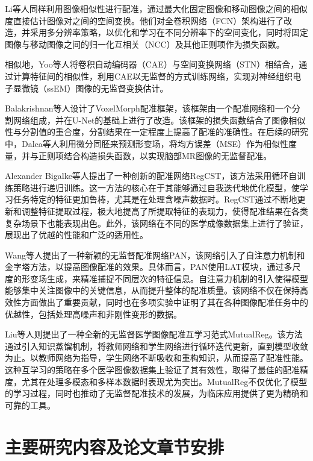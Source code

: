 Li等人同样利用图像相似性进行配准，通过最大化固定图像和移动图像之间的相似度直接估计图像对之间的空间变换。他们对全卷积网络（FCN）\cite{long2015fully}架构进行了改造，并采用多分辨率策略，以优化和学习在不同分辨率下的空间变化，同时将固定图像与移动图像之间的归一化互相关（NCC）及其他正则项作为损失函数。

相似地，Yoo等人\cite{avants2008symmetric}将卷积自动编码器（CAE）与空间变换网络（STN）\cite{jaderberg2015spatial}相结合，通过计算特征间的相似性，利用CAE以无监督的方式训练网络，实现对神经组织电子显微镜（ssEM）图像的无监督变换估计。

Balakrishnan等人设计了VoxelMorph配准框架\cite{balakrishnan2018unsupervised,balakrishnan2019voxelmorph}，该框架由一个配准网络和一个分割网络组成，并在U-Net\cite{ronneberger2015u}的基础上进行了改造。该框架的损失函数结合了图像相似性与分割值的重合度，分割结果在一定程度上提高了配准的准确性。在后续的研究中，Dalca等人利用微分同胚来预测形变场，将均方误差（MSE）作为相似性度量，并与正则项结合构造损失函数，以实现脑部MR图像的无监督配准。

Alexander Bigalke等人提出了一种创新的配准网络RegCST\cite{bigalke2023unsupervised}，该方法采用循环自训练策略进行递归训练。这一方法的核心在于其能够通过自我迭代地优化模型，使学习任务特定的特征更加鲁棒，尤其是在处理含噪声数据时。RegCST通过不断地更新和调整特征提取过程，极大地提高了所提取特征的表现力，使得配准结果在各类复杂场景下也能表现出色。此外，该网络在不同的医学成像数据集上进行了验证，展现出了优越的性能和广泛的适用性。

Wang等人提出了一种新颖的无监督配准网络PAN\cite{wang2024pyramid}，该网络引入了自注意力机制和金字塔方法，以提高图像配准的效果。具体而言，PAN使用LAT模块，通过多尺度的形变场生成，来精准捕捉不同层次的特征信息。自注意力机制的引入使得模型能够集中关注图像中的关键信息，从而提升整体的配准质量。该网络不仅在保持高效性方面做出了重要贡献，同时也在多项实验中证明了其在各种图像配准任务中的优越性，包括处理高噪声和非刚性变形的数据。

Liu等人则提出了一种全新的无监督医学图像配准互学习范式MutualReg\cite{liu2024mutualreg}。该方法通过引入知识蒸馏机制，将教师网络和学生网络进行循环迭代更新，直到模型收敛为止。以教师网络为指导，学生网络不断吸收和重构知识，从而提高了配准性能。这种互学习的策略在多个医学图像数据集上验证了其有效性，取得了最佳的配准精度，尤其在处理多模态和多样本数据时表现尤为突出。MutualReg不仅优化了模型的学习过程，同时也推动了无监督配准技术的发展，为临床应用提供了更为精确和可靠的工具。


\section{主要研究内容及论文章节安排}

